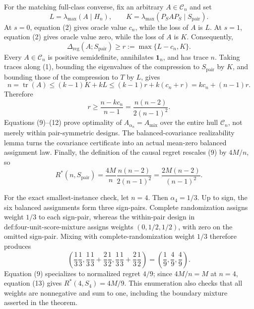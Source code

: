 For the matching full-class converse, fix an arbitrary \(A\in\mathcal C_n\) and set
\[
 L=\lambda_{\max}(A\mid H_n),
 \qquad
 K=\lambda_{\max}(P_SAP_S\mid S_{\mathrm{pair}}).
\]
At \(s=0\), equation (2) gives oracle value \(c_n\), while the loss of \(A\) is \(L\).  At \(s=1\), equation (2) gives oracle value zero, while the loss of \(A\) is \(K\).  Consequently,
\[
 \Delta_{\mathrm{reg}}(A;S_{\mathrm{pair}})
 \geq r:=\max\{L-c_n,K\}.
 \tag{10}
\]
Every \(A\in\mathcal C_n\) is positive semidefinite, annihilates \(\mathbf 1_n\), and has trace \(n\).  Taking traces along (1), bounding the eigenvalues of the compression to \(S_{\mathrm{pair}}\) by \(K\), and bounding those of the compression to \(T\) by \(L\), gives
\[
 n=\operatorname{tr}(A)
 \leq(k-1)K+kL
 \leq(k-1)r+k(c_n+r)
 =kc_n+(n-1)r.
 \tag{11}
\]
Therefore
\[
 r\geq\frac{n-kc_n}{n-1}
 =\frac{n(n-2)}{2(n-1)^2}.
 \tag{12}
\]
Equations (9)--(12) prove optimality of \(A_{\alpha_n}=A_{\mathrm{mix}}\) over the entire hull \(\mathcal C_n\), not merely within pair-symmetric designs.  The balanced-covariance realizability lemma turns the covariance certificate into an actual mean-zero balanced assignment law.  Finally, the definition of the causal regret rescales (9) by \(4M/n\), so
\[
 R^*(n,S_{\mathrm{pair}})
 =\frac{4M}{n}\frac{n(n-2)}{2(n-1)^2}
 =\frac{2M(n-2)}{(n-1)^2}.
 \tag{13}
\]

For the exact smallest-instance check, let \(n=4\).  Then \(\alpha_4=1/3\).  Up to sign, the six balanced assignments form three sign-pairs.  Complete randomization assigns weight \(1/3\) to each sign-pair, whereas the within-pair design in \(\text{def:four-unit-score-mixture}\) assigns weights \((0,1/2,1/2)\), with zero on the omitted sign-pair.  Mixing with complete-randomization weight \(1/3\) therefore produces
\[
 \left(
 \frac13\frac13,
 \frac13\frac13+\frac23\frac12,
 \frac13\frac13+\frac23\frac12
 \right)
 =\left(\frac19,\frac49,\frac49\right).
\]
Equation (9) specializes to normalized regret \(4/9\); since \(4M/n=M\) at \(n=4\), equation (13) gives \(R^*(4,S_4)=4M/9\).  This enumeration also checks that all weights are nonnegative and sum to one, including the boundary mixture asserted in the theorem.